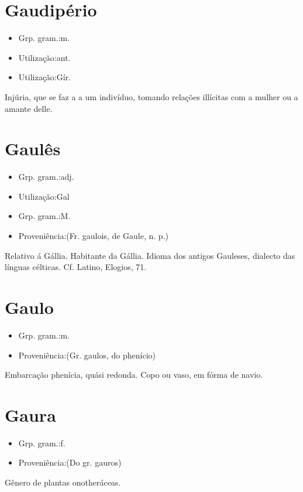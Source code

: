 \section{Gaudipério}
\begin{itemize}
\item {Grp. gram.:m.}
\end{itemize}
\begin{itemize}
\item {Utilização:ant.}
\end{itemize}
\begin{itemize}
\item {Utilização:Gír.}
\end{itemize}
Injúria, que se faz a a um indivíduo, tomando relações illícitas com a mulher ou a amante delle.
\section{Gaulês}
\begin{itemize}
\item {Grp. gram.:adj.}
\end{itemize}
\begin{itemize}
\item {Utilização:Gal}
\end{itemize}
\begin{itemize}
\item {Grp. gram.:M.}
\end{itemize}
\begin{itemize}
\item {Proveniência:(Fr. \textunderscore gaulois\textunderscore , de \textunderscore Gaule\textunderscore , n. p.)}
\end{itemize}
Relativo á Gállia.
Habitante da Gállia.
Idioma dos antigos Gauleses, dialecto das línguas célticas. Cf. Latino, \textunderscore Elogios\textunderscore , 71.
\section{Gaulo}
\begin{itemize}
\item {Grp. gram.:m.}
\end{itemize}
\begin{itemize}
\item {Proveniência:(Gr. \textunderscore gaulos\textunderscore , do phenício)}
\end{itemize}
Embarcação phenícia, quási redonda.
Copo ou vaso, em fórma de navio.
\section{Gaura}
\begin{itemize}
\item {Grp. gram.:f.}
\end{itemize}
\begin{itemize}
\item {Proveniência:(Do gr. \textunderscore gauros\textunderscore )}
\end{itemize}
Gênero de plantas onotheráceas.
